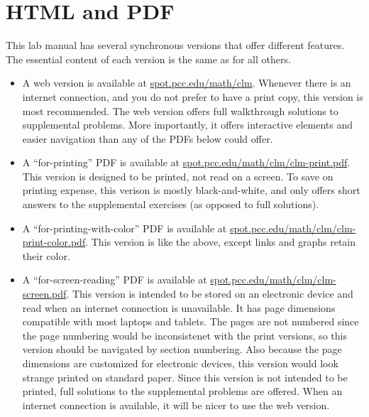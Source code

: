 \documentclass[10pt,oneside,]{book}
\theoremstyle{plain}
\theoremstyle{definition}
\numberwithin{equation}{section}
\begin{document}
\chapter*{HTML and PDF}\label{versions}
This lab manual has several synchronous versions that offer different features. The essential content of each version is the same as for all others.%
\begin{itemize}[label=\textbullet]
\item{}A web version is available at \url{spot.pcc.edu/math/clm}. Whenever there is an internet connection, and you do not prefer to have a print copy, this version is most recommended. The web version offers full walkthrough solutions to supplemental problems. More importantly, it offers interactive elements and easier navigation than any of the PDFs below could offer.%
\item{}A ``for-printing'' PDF is available at \url{spot.pcc.edu/math/clm/clm-print.pdf}. This version is designed to be printed, not read on a screen. To save on printing expense, this verison is mostly black-and-white, and only offers short answers to the supplemental exercises (as opposed to full solutions).%
\item{}A ``for-printing-with-color'' PDF is available at \url{spot.pcc.edu/math/clm/clm-print-color.pdf}. This version is like the above, except links and graphs retain their color.%
\item{}A ``for-screen-reading'' PDF is available at \url{spot.pcc.edu/math/clm/clm-screen.pdf}. This version is intended to be stored on an electronic device and read when an internet connection is unavailable. It has page dimensions compatible with most laptops and tablets. The pages are not numbered since the page numbering would be inconsistenet with the print versions, so this version should be navigated by section numbering. Also because the page dimensions are customized for electronic devices, this version would look strange printed on standard paper. Since this version is not intended to be printed, full solutions to the supplemental problems are offered. When an internet connection is available, it will be nicer to use the web version.%
\end{itemize}
\end{document}
